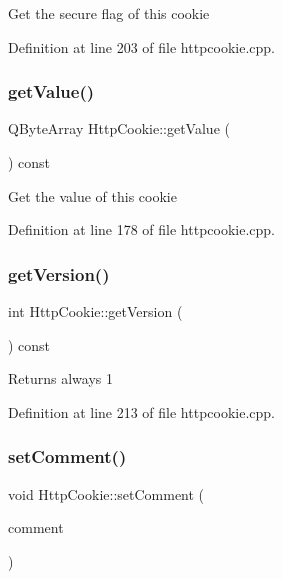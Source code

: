 Get the secure flag of this cookie 

Definition at line 203 of file httpcookie.\+cpp.

\mbox{\label{classstefanfrings_1_1_http_cookie_a04d3cdafe9c7e5f9068816abf33aa4a9}} 
\subsubsection{\texorpdfstring{get\+Value()}{getValue()}}
{\footnotesize\ttfamily Q\+Byte\+Array Http\+Cookie\+::get\+Value (\begin{DoxyParamCaption}{ }\end{DoxyParamCaption}) const}

Get the value of this cookie 

Definition at line 178 of file httpcookie.\+cpp.

\mbox{\label{classstefanfrings_1_1_http_cookie_ac390582430915aa5570c6a397f20210d}} 
\subsubsection{\texorpdfstring{get\+Version()}{getVersion()}}
{\footnotesize\ttfamily int Http\+Cookie\+::get\+Version (\begin{DoxyParamCaption}{ }\end{DoxyParamCaption}) const}

Returns always 1 

Definition at line 213 of file httpcookie.\+cpp.

\mbox{\label{classstefanfrings_1_1_http_cookie_a51b8f8e7fcb77f6f9d9750545cd2e98b}} 
\subsubsection{\texorpdfstring{set\+Comment()}{setComment()}}
{\footnotesize\ttfamily void Http\+Cookie\+::set\+Comment (\begin{DoxyParamCaption}\item[{const Q\+Byte\+Array}]{comment }\end{DoxyParamCaption})}

